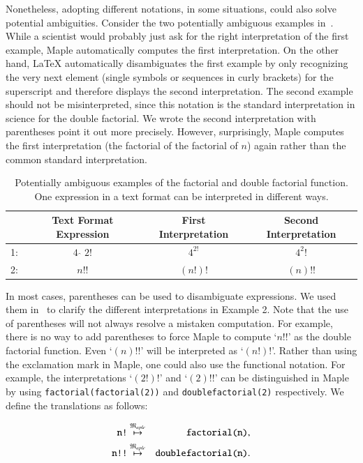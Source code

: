 \documentclass[a4paper,11pt]{article}
\newcommand{\Maple}{Maple}
\newcommand{\langMaple}{\mathfrak{M}_{aple}}
\theoremstyle{defTheoStyle}
\theoremstyle{defExampStyle}
\begin{document}
Nonetheless, adopting different notations, in some situations, could also solve potential ambiguities. Consider the two potentially ambiguous examples in~. While a scientist would probably just ask for the right interpretation of the first example, \Maple{} automatically computes the first interpretation. On the other hand, \LaTeX{} automatically disambiguates the first example by only recognizing the very next element (single symbols or sequences in curly brackets) for the superscript and therefore displays the second interpretation. The second example should not be misinterpreted, since this notation is the standard interpretation in science for the double factorial. We wrote the second interpretation with parentheses point it out more precisely. However, surprisingly, \Maple{} computes the first interpretation (the factorial of the factorial of $n$) again rather than the common standard interpretation.
\begin{table}[ht]
\centering
\begin{tabular}{lccc}
	\hline
	& Text Format Expression & First Interpretation & Second Interpretation\\
	\hline
	1: & \rule{0pt}{0.9\normalbaselineskip} $4\ \hat{\ }\ 2!$ & $4^{2!}$ & $4^2!$ \\
	2: & $n!!$ & $(n!)!$ & $(n)!!$\\
	\hline
\end{tabular}
\caption{Potentially ambiguous examples of the factorial and double factorial function. One expression in a text format can be interpreted in different ways.}
\label{tab:amb_ex}
\end{table}

In most cases, parentheses can be used to disambiguate expressions. We used them in~ to clarify the different interpretations in Example 2. Note that the use of parentheses will not always resolve a mistaken computation. For example, there is no way to add parentheses to force \Maple{} to compute `$n!!$' as the double factorial function. Even `$(n)!!$' will be interpreted as `$(n!)!$'. Rather than using the exclamation mark in \Maple, one could also use the functional notation. For example, the interpretations `$(2!)!$' and `$(2)!!$' can be distinguished in \Maple{} by using \verb|factorial(factorial(2))| and \verb|doublefactorial(2)| respectively. We define the translations as follows:

\begin{eqnarray*}
\verb|n!| &\overset{\langMaple}{\mapsto}& \verb|factorial(n)|,\\
\verb|n!!| &\overset{\langMaple}{\mapsto}& \verb|doublefactorial(n)|.
\end{eqnarray*}
\end{document}
